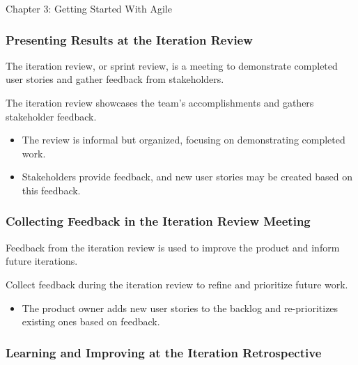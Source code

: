 \begin{notes}{Chapter 3: Getting Started With Agile}
    \subsubsection*{Presenting Results at the Iteration Review}
    
    The iteration review, or sprint review, is a meeting to demonstrate completed user stories and gather feedback from stakeholders.
    
    \begin{highlight}
    
        The iteration review showcases the team's accomplishments and gathers stakeholder feedback.
        
        \begin{itemize}
            \item The review is informal but organized, focusing on demonstrating completed work.
            \item Stakeholders provide feedback, and new user stories may be created based on this feedback.
        \end{itemize}
    
    \end{highlight}
    
    \subsubsection*{Collecting Feedback in the Iteration Review Meeting}
    
    Feedback from the iteration review is used to improve the product and inform future iterations.
    
    \begin{highlight}
    
        Collect feedback during the iteration review to refine and prioritize future work.
        
        \begin{itemize}
            \item The product owner adds new user stories to the backlog and re-prioritizes existing ones based on feedback.
        \end{itemize}
    
    \end{highlight}
    
    \subsubsection*{Learning and Improving at the Iteration Retrospective}
    

\end{notes}
